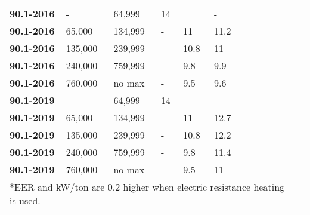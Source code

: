\begin{table}
\begin{tabular}{|p{0.4in}|p{0.4in}|p{0.4in}|p{0.4in}|p{0.4in}|p{0.4in}|p{0.4in}|p{0.4in}|p{0.4in}|p{0.4in}|p{0.4in}|p{0.4in}|}
\textbf{90.1-2016} & - & 64,999 & 14 & & - & & & & & \\ \cline{1-6}
\textbf{90.1-2016} & 65,000 & 134,999 & - & 11 & 11.2 & & & & & \\ \cline{1-6}
\textbf{90.1-2016} & 135,000 & 239,999 & - & 10.8 & 11 & & & & & \\ \cline{1-6}
\textbf{90.1-2016} & 240,000 & 759,999 & - & 9.8 & 9.9 & & & & & \\ \cline{1-6}
\textbf{90.1-2016} & 760,000 & no max & - & 9.5 & 9.6 & & & & & \\ \cline{1-6}
\textbf{90.1-2019} & - & 64,999 & 14 & - & - & & & & & \\ \cline{1-6}
\textbf{90.1-2019} & 65,000 & 134,999 & - & 11 & 12.7 & & & & & \\ \cline{1-6}
\textbf{90.1-2019} & 135,000 & 239,999 & - & 10.8 & 12.2 & & & & & \\ \cline{1-6}
\textbf{90.1-2019} & 240,000 & 759,999 & - & 9.8 & 11.4 & & & &  & \\ \cline{1-6}
\textbf{90.1-2019} & 760,000 & no max & - & 9.5 & 11 & & & &  & \\ \hline
\multicolumn{11}{l}{*EER and kW/ton are 0.2 higher when electric resistance heating is used.} \\
\end{tabular}
\end{table}